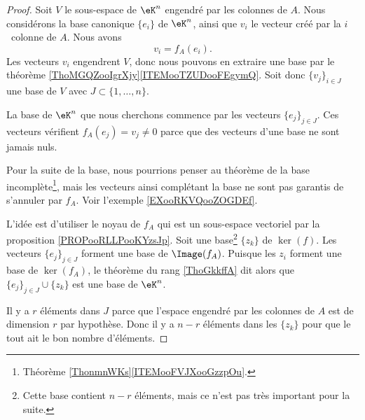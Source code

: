 \begin{proof}
	Soit \( V\) le sous-espace de \( \eK^n\) engendré par les colonnes de \( A\). Nous considérons la base canonique \( \{ e_i \}\) de \( \eK^n\), ainsi que \( v_i\) le vecteur créé par la \( i\)\ieme\ colonne de \( A\). Nous avons
	\begin{equation}
		v_i=f_A(e_i).
	\end{equation}
	Les vecteurs \( v_i\) engendrent \( V\), donc nous pouvons en extraire une base par le théorème \ref{ThoMGQZooIgrXjy}\ref{ITEMooTZUDooFEgymQ}. Soit donc \( \{ v_j \}_{i\in J}\) une base de \( V\) avec \( J\subset\{ 1,\ldots, n \}\).

	La base de \( \eK^n\) que nous cherchons commence par les vecteurs \( \{ e_j \}_{j\in J}\). Ces vecteurs vérifient \( f_A(e_j)=v_j\neq 0\) parce que des vecteurs d'une base ne sont jamais nuls.

	Pour la suite de la base, nous pourrions penser au théorème de la base incomplète\footnote{Théorème \ref{ThonmnWKs}\ref{ITEMooFVJXooGzzpOu}.}, mais les vecteurs ainsi complétant la base ne sont pas garantis de s'annuler par \( f_A\). Voir l'exemple \ref{EXooRKVQooZOGDEf}.

	L'idée est d'utiliser le noyau de \( f_A\) qui est un sous-espace vectoriel par la proposition \ref{PROPooRLLPooKYzsJp}. Soit une base\footnote{Cette base contient \( n-r\) éléments, mais ce n'est pas très important pour la suite.} \(  \{ z_k \}  \) de \( \ker(f)\). Les vecteurs \( \{ e_j \}_{j\in J}\) forment une base de \( \Image(f_A)\). Puisque les \( z_i\) forment une base de \( \ker(f_A)\), le théorème du rang \ref{ThoGkkffA} dit alors que \( \{ e_j \}_{j\in J}\cup \{ z_k \}\) est une base de \( \eK^n\).

	Il y a \( r\) éléments dans \( J\) parce que l'espace engendré par les colonnes de \( A\) est de dimension \( r\) par hypothèse. Donc il y a \( n-r\) éléments dans les \( \{ z_k \}\) pour que le tout ait le bon nombre d'éléments.
\end{proof}

